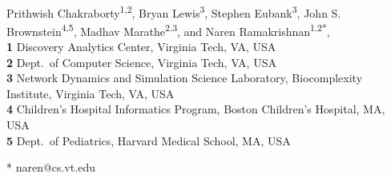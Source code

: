 \documentclass[10pt,letterpaper]{article}
\date{}
\begin{document}
\vspace*{0.2in}

\begin{flushleft}
{\Large
\textbf{} %
}
\newline
\\
Prithwish Chakraborty\textsuperscript{1,2},
Bryan Lewis\textsuperscript{3},
Stephen Eubank\textsuperscript{3},
John S. Brownstein\textsuperscript{4,5},
Madhav Marathe\textsuperscript{2,3}, and
Naren Ramakrishnan\textsuperscript{1,2*},
\\
\bigskip
\textbf{1} Discovery Analytics Center, Virginia Tech, VA, USA\\
\textbf{2} Dept.\ of Computer Science, Virginia Tech, VA, USA\\
\textbf{3} Network Dynamics and Simulation Science Laboratory, Biocomplexity Institute, Virginia Tech, VA, USA\\
\textbf{4} Children's Hospital Informatics Program, Boston Children’s Hospital, MA, USA\\
\textbf{5} Dept.\ of Pediatrics, Harvard Medical School, MA, USA\\
\bigskip

% 
%






* naren@cs.vt.edu

\end{flushleft}
\end{document}
